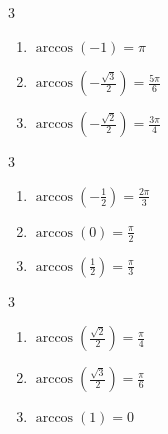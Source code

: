\documentclass{ximera}
\begin{document}
\begin{multicols}{3} 

\begin{enumerate}

\setcounter{enumi}{\value{HW}}

\item $\arccos \left( -1 \right) = \pi$ 
\item $\arccos \left( -\frac{\sqrt{3}}{2} \right) = \frac{5\pi}{6}$
\item $\arccos \left( -\frac{\sqrt{2}}{2} \right) = \frac{3\pi}{4}$

\setcounter{HW}{\value{enumi}}

\end{enumerate}

\end{multicols}

\begin{multicols}{3} 

\begin{enumerate}

\setcounter{enumi}{\value{HW}}

\item $\arccos \left( -\frac{1}{2} \right) = \frac{2\pi}{3}$
\item $\arccos \left( 0 \right) = \frac{\pi}{2}$ 
\item $\arccos \left( \frac{1}{2} \right) = \frac{\pi}{3}$

\setcounter{HW}{\value{enumi}}

\end{enumerate}

\end{multicols}

\begin{multicols}{3} 

\begin{enumerate}

\setcounter{enumi}{\value{HW}}

\item $\arccos \left( \frac{\sqrt{2}}{2} \right) = \frac{\pi}{4}$
\item $\arccos \left( \frac{\sqrt{3}}{2} \right) = \frac{\pi}{6}$
\item $\arccos \left( 1 \right) = 0$ 

\setcounter{HW}{\value{enumi}}

\end{enumerate}

\end{multicols}
\end{document}
